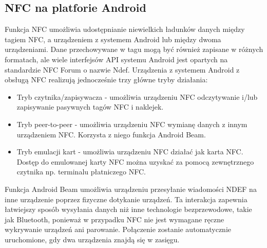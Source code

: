 \subsection{NFC na platforie Android}
Funkcja NFC umożliwia udostępnianie niewielkich ładunków danych między tagiem NFC, a urządzeniem z systemem Android lub między dwoma urządzeniami. Dane przechowywane w tagu mogą być również zapisane w różnych formatach, ale wiele interfejsów API systemu Android jest opartych na standardzie NFC Forum o nazwie Ndef. Urządzenia z systemem Android z obsługą NFC realizują jednocześnie trzy główne tryby działania:
\begin{itemize}
\item Tryb czytnika/zapisywacza - umożliwia urządzeniu NFC odczytywanie i/lub zapisywanie pasywnych tagów NFC i naklejek.
\item Tryb peer-to-peer - umożliwia urządzeniu NFC wymianę danych z innym urządzeniem NFC. Korzysta z niego funkcja Android Beam.
\item Tryb emulacji kart - umożliwia urządzeniu NFC działać jak karta NFC. Dostęp do emulowanej karty NFC można uzyskać za pomocą zewnętrznego czytnika np. terminalu płatniczego NFC.
\end{itemize}
 Funkcja Android Beam umożliwia urządzeniu przesyłanie wiadomości NDEF na inne urządzenie poprzez fizyczne dotykanie urządzeń. Ta interakcja zapewnia łatwiejszy sposób wysyłania danych niż inne technologie bezprzewodowe, takie jak Bluetooth, ponieważ w przypadku NFC nie jest wymagane ręczne wykrywanie urządzeń ani parowanie. Połączenie zostanie automatycznie uruchomione, gdy dwa urządzenia znajdą się w zasięgu.
